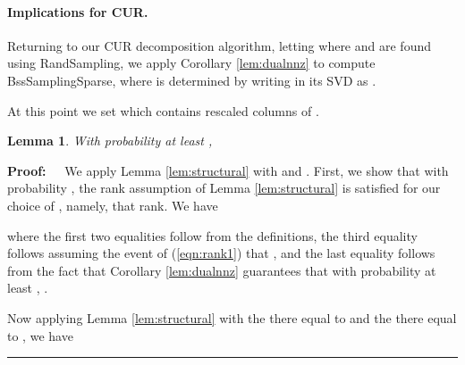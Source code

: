 \documentclass[11pt]{article}
\newtheorem{lemma}[theorem]{Lemma}
\newenvironment{proof}{\begin{trivlist} \item {\bf Proof:~~}}
  {\qed\end{trivlist}}
\def\qed{\hfill\rule{2mm}{2mm}}
\begin{document}
\paragraph{Implications for CUR.} 
Returning to our CUR decomposition algorithm, letting  where
 and  are found using {\textsc RandSampling}, we apply 
Corollary \ref{lem:dualnnz} to compute 
{\textsc BssSamplingSparse},
where  is determined by writing  in its SVD as . 

At this point we set  which contains 
 rescaled columns of . 

\begin{lemma}\label{lem:conk}
With probability at least , 

\end{lemma}
\begin{proof}
We apply Lemma \ref{lem:structural} with  and 
. First, we show that with probability , 
the rank assumption of Lemma \ref{lem:structural} is satisfied for our choice of , namely, that 
rank. We have 

where the first two equalities follow from the definitions, the third equality follows assuming the 
event of (\ref{eqn:rank1}) that , and the last equality follows from
the fact that Corollary \ref{lem:dualnnz} guarantees that with probability at least ,
. 

Now applying Lemma \ref{lem:structural} with the  there equal
to  and the  there equal to , we have


\end{proof}
\end{document}
